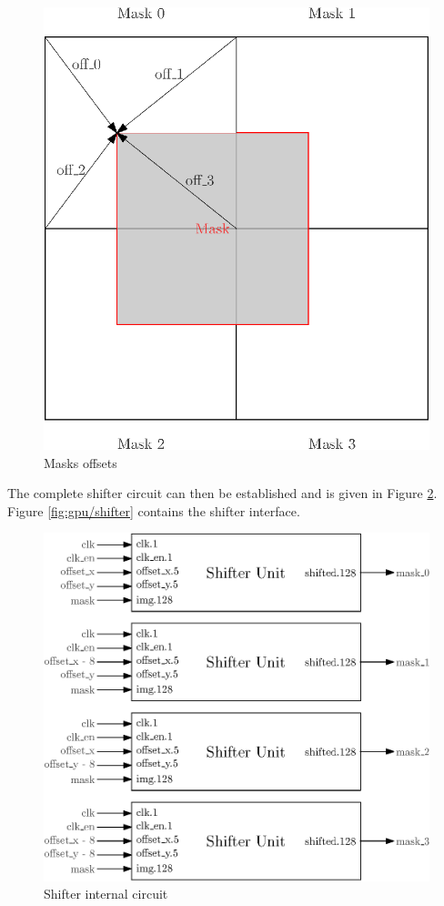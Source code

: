 \begin{figure}[H]
    \centering
    \includegraphics[scale=1.0]{Chapter4-GPU_CLKU/res/shifter_offsets}
    \caption{Masks offsets}
    \label{fig:gpu/shifter_offsets}
\end{figure}

The complete shifter circuit can then be established and is given in Figure \ref{fig:gpu/shifter_in}. 
Figure \ref{fig:gpu/shifter} contains the shifter interface.

\begin{figure}[H]
    \centering
    \includegraphics[scale=1.0]{Chapter4-GPU_CLKU/res/shifter_in}
    \caption{Shifter internal circuit}
    \label{fig:gpu/shifter_in}
\end{figure}

